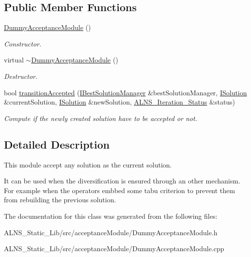 \subsection*{\-Public \-Member \-Functions}
\begin{DoxyCompactItemize}
\item 
\hypertarget{classDummyAcceptanceModule_ab906bf78a974bbe427ed861b74d7ae79}{\hyperlink{classDummyAcceptanceModule_ab906bf78a974bbe427ed861b74d7ae79}{\-Dummy\-Acceptance\-Module} ()}\label{classDummyAcceptanceModule_ab906bf78a974bbe427ed861b74d7ae79}

\begin{DoxyCompactList}\small\item\em \-Constructor. \end{DoxyCompactList}\item 
\hypertarget{classDummyAcceptanceModule_a7e2568aa7b42a6e06d7b3d962a1ff721}{virtual \hyperlink{classDummyAcceptanceModule_a7e2568aa7b42a6e06d7b3d962a1ff721}{$\sim$\-Dummy\-Acceptance\-Module} ()}\label{classDummyAcceptanceModule_a7e2568aa7b42a6e06d7b3d962a1ff721}

\begin{DoxyCompactList}\small\item\em \-Destructor. \end{DoxyCompactList}\item 
\hypertarget{classDummyAcceptanceModule_a0db83ebfd5f38764dcd7a747cf3feb5a}{bool \hyperlink{classDummyAcceptanceModule_a0db83ebfd5f38764dcd7a747cf3feb5a}{transition\-Accepted} (\hyperlink{classIBestSolutionManager}{\-I\-Best\-Solution\-Manager} \&best\-Solution\-Manager, \hyperlink{classISolution}{\-I\-Solution} \&current\-Solution, \hyperlink{classISolution}{\-I\-Solution} \&new\-Solution, \hyperlink{classALNS__Iteration__Status}{\-A\-L\-N\-S\-\_\-\-Iteration\-\_\-\-Status} \&status)}\label{classDummyAcceptanceModule_a0db83ebfd5f38764dcd7a747cf3feb5a}

\begin{DoxyCompactList}\small\item\em \-Compute if the newly created solution have to be accepted or not. \end{DoxyCompactList}\end{DoxyCompactItemize}


\subsection{\-Detailed \-Description}
\-This module accept any solution as the current solution. 

\-It can be used when the diversification is ensured through an other mechanism. \-For example when the operators embbed some tabu criterion to prevent them from rebuilding the previous solution. 

\-The documentation for this class was generated from the following files\-:\begin{DoxyCompactItemize}
\item 
\-A\-L\-N\-S\-\_\-\-Static\-\_\-\-Lib/src/acceptance\-Module/\-Dummy\-Acceptance\-Module.\-h\item 
\-A\-L\-N\-S\-\_\-\-Static\-\_\-\-Lib/src/acceptance\-Module/\-Dummy\-Acceptance\-Module.\-cpp\end{DoxyCompactItemize}
